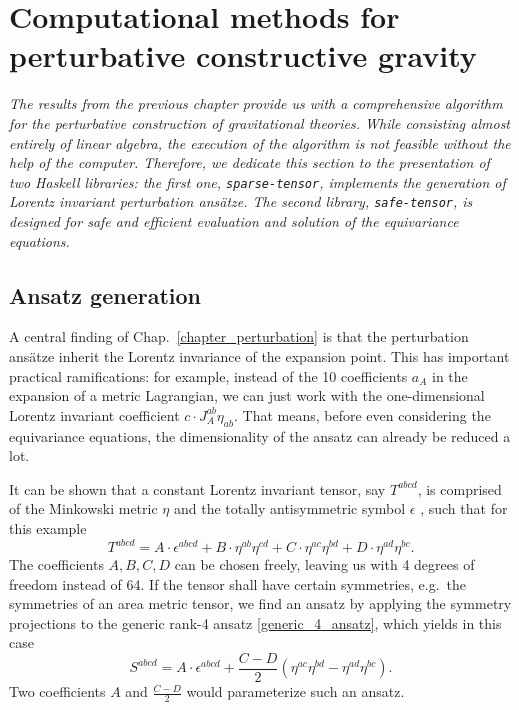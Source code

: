 \chapter{Computational methods for perturbative constructive gravity}
\label{chapter_computational_methods}

\textit{The results from the previous chapter provide us with a comprehensive algorithm for the perturbative construction of gravitational theories. While consisting almost entirely of linear algebra, the execution of the algorithm is not feasible without the help of the computer. Therefore, we dedicate this section to the presentation of two Haskell libraries: the first one, \texttt{sparse-tensor}, implements the generation of Lorentz invariant perturbation ansätze. The second library, \texttt{safe-tensor}, is designed for safe and efficient evaluation and solution of the equivariance equations.}

\section{Ansatz generation}
A central finding of Chap.\ \ref{chapter_perturbation} is that the perturbation ansätze inherit the Lorentz invariance of the expansion point. This has important practical ramifications: for example, instead of the 10 coefficients $a_A$ in the expansion of a metric Lagrangian, we can just work with the one-dimensional Lorentz invariant coefficient $c\cdot J_A^{ab} \eta_{ab}$. That means, before even considering the equivariance equations, the dimensionality of the ansatz can already be reduced a lot.

It can be shown that a constant Lorentz invariant tensor, say $T^{abcd}$, is comprised of the Minkowski metric $\eta$ and the totally antisymmetric symbol $\epsilon$ \cite{}, such that for this example
\begin{equation}\label{generic_4_ansatz}
  T^{abcd} = A \cdot \epsilon^{abcd} + B \cdot \eta^{ab} \eta^{cd} + C \cdot \eta^{ac} \eta^{bd} + D \cdot \eta^{ad} \eta^{bc}.
\end{equation}
The coefficients $A,B,C,D$ can be chosen freely, leaving us with 4 degrees of freedom instead of 64. If the tensor shall have certain symmetries, e.g.\ the symmetries of an area metric tensor, we find an ansatz by applying the symmetry projections to the generic rank-4 ansatz \eqref{generic_4_ansatz}, which yields in this case
\begin{equation}
  S^{abcd} = A \cdot \epsilon^{abcd} + \frac{C - D}{2} \left( \eta^{ac}\eta^{bd} - \eta^{ad}\eta^{bc} \right).
\end{equation}
Two coefficients $A$ and $\frac{C-D}{2}$ would parameterize such an ansatz.

